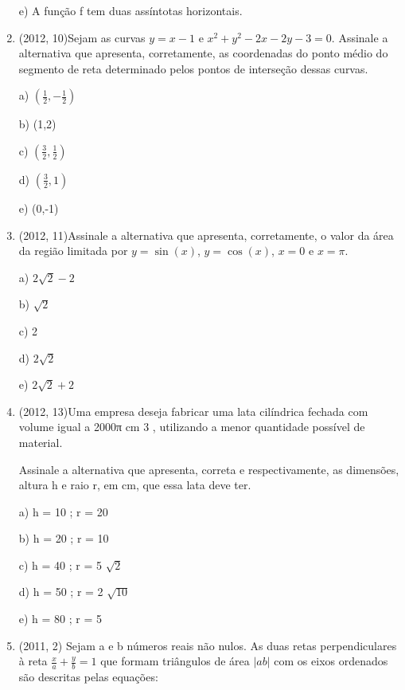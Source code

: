\documentclass{article}
\begin{document}
\begin{enumerate}
e) A função f tem duas assíntotas horizontais.\newline





\item(2012, 10)Sejam as curvas $y = x - 1$ e $x^2 + y^2 - 2x - 2y - 3 = 0.$ Assinale a alternativa que apresenta, corretamente, as coordenadas do ponto médio do segmento de reta determinado pelos pontos de interseção dessas curvas.

a) $( \frac{1}{2}, -\frac{1}{2})$

b) (1,2)

c) $( \frac{3}{2}, \frac{1}{2})$

d) $( \frac{3}{2}, 1)$

e) (0,-1)\newline



\item(2012, 11)Assinale a alternativa que apresenta, corretamente, o valor da área da região limitada por $y = \sin(x)$, $y = \cos(x)$, $x = 0$ e $x = \pi$.

a) $2\sqrt{2} - 2$

b) $\sqrt{2}$

c) 2

d) $2 \sqrt{2}$

e) $2\sqrt{2} + 2$\newline




\item(2012, 13)Uma empresa deseja fabricar uma lata cilíndrica fechada com volume igual a 2000π cm 3 , utilizando a menor quantidade possível de material.

Assinale a alternativa que apresenta, correta e respectivamente, as dimensões, altura h e raio r, em cm,
que essa lata deve ter.

a) h = 10 ; r = 20

b) h = 20 ; r = 10

c) h = 40 ; r = 5 $\sqrt{2}$

d) h = 50 ; r = 2 $\sqrt{10}$

e) h = 80 ; r = 5\newline




\item(2011, 2) Sejam a e b números reais não nulos. As duas retas perpendiculares à reta $\frac{x}{a} + \frac{y}{b} = 1$ que formam triângulos de área $|ab|$ com os eixos ordenados são descritas pelas equações:


\end{enumerate}
\end{document}
